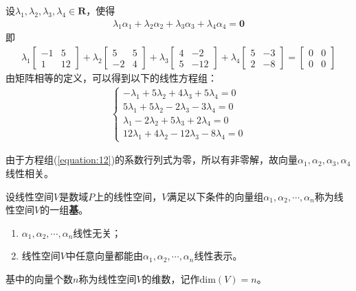 \begin{solution}
    设$\lambda_{1},\lambda_{2},\lambda_{3},\lambda_{4}\in{\mathbf{R}}$，使得
    \begin{eqnarray}
        \lambda_{1}\alpha_{1}+\lambda_{2}\alpha_{2}+\lambda_{3}\alpha_{3}+\lambda_{4}\alpha_{4}=\mathbf{0}\nonumber
    \end{eqnarray}
    即
    \begin{eqnarray}
        \lambda_{1}\left[\begin{array}{cc}
            -1 & 5\\
            1& 12
        \end{array}\right]+\lambda_{2}\left[\begin{array}{cc}
            5 & 5\\
            -2& 4
        \end{array}\right]+\lambda_{3}\left[\begin{array}{cc}
            4 & -2\\
            5& -12
        \end{array}\right]+\lambda_{4}\left[\begin{array}{cc}
            5 & -3\\
            2& -8
        \end{array}\right]=\left[\begin{array}{cc}
            0 & 0\\
            0 & 0
        \end{array}\right]\nonumber
    \end{eqnarray}
    由矩阵相等的定义，可以得到以下的线性方程组：
    \begin{eqnarray}
        \begin{cases}
            -\lambda_{1}+5\lambda_{2}+4\lambda_{3}+5\lambda_{4}=0\\
            5\lambda_{1}+5\lambda_{2}-2\lambda_{3}-3\lambda_{4}=0\\
            \lambda_{1}-2\lambda_{2}+5\lambda_{3}+2\lambda_{4}=0\\
            12\lambda_{1}+4\lambda_{2}-12\lambda_{3}-8\lambda_{4}=0
        \end{cases}\label{equation:12}
    \end{eqnarray}

    由于方程组(\ref{equation:12})的系数行列式为零，所以有非零解，故向量$\alpha_{1},\alpha_{2},\alpha_{3},\alpha_{4}$线性相关。
\end{solution}

\begin{definition}
    设线性空间$V$是数域$P$上的线性空间，$V$满足以下条件的向量组$\alpha_{1},\alpha_{2},\cdots,\alpha_{n}$称为线性空间$V$的一组\textbf{基}。
    \begin{enumerate}[label=(\arabic*)]
        \item $\alpha_{1},\alpha_{2},\cdots,\alpha_{n}$线性无关；
        \item 线性空间$V$中任意向量都能由$\alpha_{1},\alpha_{2},\cdots,\alpha_{n}$线性表示。
    \end{enumerate}
    基中的向量个数$n$称为线性空间$V$的维数，记作$\text{dim}(V)=n$。
\end{definition}


